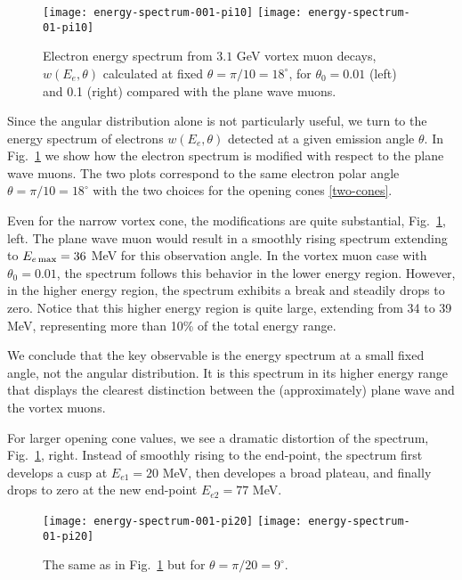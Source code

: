 \documentclass[aps,prd,longbibliography,nofootinbib,amsthm,amsmath,amssymb,amsfonts,notitlepage]{revtex4-1}
\begin{document}
\begin{figure}[!h]
	\centering
	\texttt{[image: energy-spectrum-001-pi10]}\hfill
	\texttt{[image: energy-spectrum-01-pi10]}
	\caption{Electron energy spectrum from $3.1$ GeV vortex muon decays, $w(E_e, \theta)$ calculated at fixed $\theta = \pi/10 = 18^\circ$,
		for $\theta_0 = 0.01$ (left) and 0.1 (right) compared with the plane wave muons.}\label{Fig-energy}
\end{figure}

Since the angular distribution alone is not particularly useful, we turn to the energy spectrum
of electrons $w(E_e, \theta)$ detected at a given emission angle $\theta$.
In Fig.~\ref{Fig-energy} we show how the electron spectrum is modified with respect to the plane wave muons.
The two plots correspond to the same electron polar angle $\theta = \pi/10 = 18^\circ$ with the two choices
for the opening cones \eqref{two-cones}.

Even for the narrow vortex cone, the modifications are quite substantial, Fig.~\ref{Fig-energy}, left.
The plane wave muon would result in a smoothly rising spectrum extending to $E_{e\, \rm max} = 36$ MeV for this observation angle.
In the vortex muon case with $\theta_0 = 0.01$, the spectrum follows this behavior in the lower energy region.
However, in the higher energy region, the spectrum exhibits a break and steadily drops to zero.
Notice that this higher energy region is quite large, extending from 34 to 39 MeV,
representing more than 10\% of the total energy range.

We conclude that the key observable is the energy spectrum at a small fixed angle, not the angular distribution.
It is this spectrum in its higher energy range that displays the clearest
distinction between the (approximately) plane wave and the vortex muons.

For larger opening cone values, we see a dramatic distortion of the spectrum, Fig.~\ref{Fig-energy}, right.
Instead of smoothly rising to the end-point, the spectrum first develops a cusp at $E_{e1} = 20$ MeV,
then developes a broad plateau, and finally drops to zero at the new end-point $E_{e2} = 77$ MeV.

\begin{figure}[!h]
	\centering
	\texttt{[image: energy-spectrum-001-pi20]}\hfill
	\texttt{[image: energy-spectrum-01-pi20]}
	\caption{The same as in Fig.~\ref{Fig-energy} but for $\theta = \pi/20 = 9^\circ$.}\label{Fig-energy2}
\end{figure}
\end{document}
